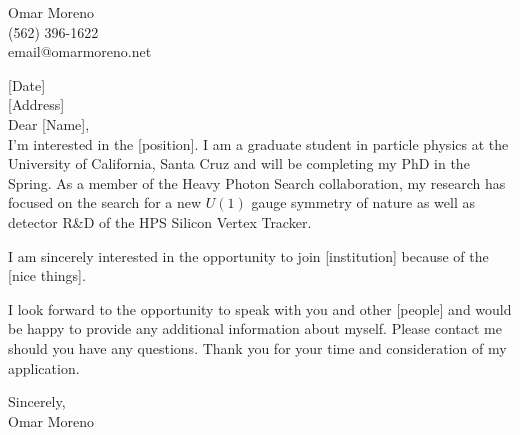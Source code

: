 \documentclass[12pt]{article}
\begin{document}
    \begin{center}
        {\Huge Omar Moreno}    \\ 
        (562) 396-1622          \\
        email@omarmoreno.net    \\
    \end{center}

    [Date] \\[11pt]

    [Address] \\[11pt]

    Dear [Name], \\[11pt]

    I'm interested in the [position]. I am a graduate student in particle 
    physics at the University of California, Santa Cruz and will be completing
    my PhD in the Spring.  As a member of the Heavy Photon Search collaboration, 
    my research has focused on the search for a new $U(1)$ gauge symmetry of
    nature as well as detector R\&D of the HPS Silicon Vertex Tracker.

    I am sincerely interested in the opportunity to join [institution] because
    of the [nice things].

    I look forward to the opportunity to speak with you and other [people] and
    would be happy to provide any additional information about myself. Please 
    contact me should you have any questions.  Thank you for your time and 
    consideration of my application.

    Sincerely, \\[11pt]

    Omar Moreno
 

\end{document}
